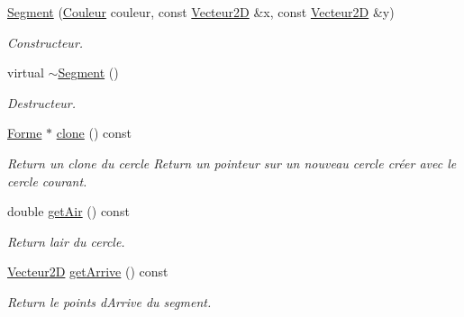 \begin{DoxyCompactItemize}
\item 
\mbox{\hyperlink{class_segment_a2d4d4fe7d5b53695a463c10f6dac73a8}{Segment}} (\mbox{\hyperlink{class_couleur}{Couleur}} couleur, const \mbox{\hyperlink{class_vecteur2_d}{Vecteur2D}} \&x, const \mbox{\hyperlink{class_vecteur2_d}{Vecteur2D}} \&y)
\begin{DoxyCompactList}\small\item\em Constructeur. \end{DoxyCompactList}\item 
\mbox{\label{class_segment_a5babc73a2978e1aa99b73a4c19d41dd8}} 
virtual \mbox{\hyperlink{class_segment_a5babc73a2978e1aa99b73a4c19d41dd8}{$\sim$\+Segment}} ()
\begin{DoxyCompactList}\small\item\em Destructeur. \end{DoxyCompactList}\item 
\mbox{\label{class_segment_a52c16b8bbaef8093b51df037003dd734}} 
\mbox{\hyperlink{class_forme}{Forme}} $\ast$ \mbox{\hyperlink{class_segment_a52c16b8bbaef8093b51df037003dd734}{clone}} () const
\begin{DoxyCompactList}\small\item\em Return un clone du cercle Return un pointeur sur un nouveau cercle créer avec le cercle courant. \end{DoxyCompactList}\item 
\mbox{\label{class_segment_a267dfd504311b462b62830f14223c1a4}} 
double \mbox{\hyperlink{class_segment_a267dfd504311b462b62830f14223c1a4}{get\+Air}} () const
\begin{DoxyCompactList}\small\item\em Return l\textquotesingle{}air du cercle. \end{DoxyCompactList}\item 
\mbox{\label{class_segment_a86c0e40a43e4a0aa222fd16826a1c0bf}} 
\mbox{\hyperlink{class_vecteur2_d}{Vecteur2D}} \mbox{\hyperlink{class_segment_a86c0e40a43e4a0aa222fd16826a1c0bf}{get\+Arrive}} () const
\begin{DoxyCompactList}\small\item\em Return le points d\textquotesingle{}Arrive du segment. \end{DoxyCompactList}\item 

\end{DoxyCompactItemize}
